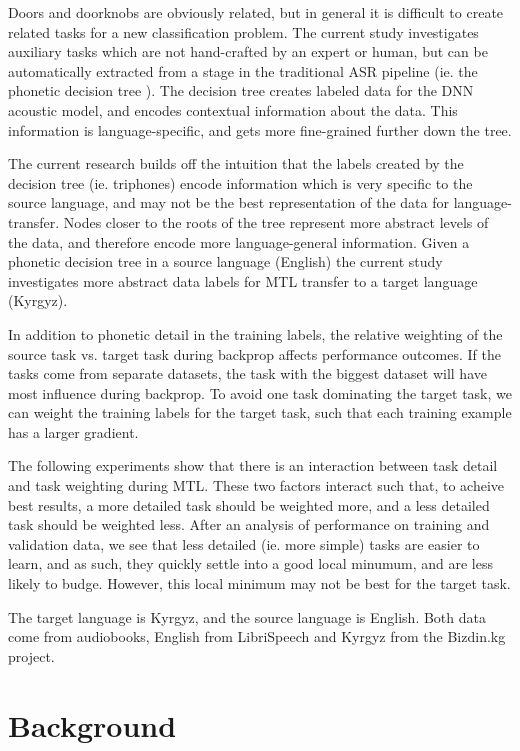 \documentclass[a4paper]{article}
\begin{document}
Doors and doorknobs are obviously related, but in general it is difficult to create related tasks for a new classification problem. The current study investigates auxiliary tasks which are not hand-crafted by an expert or human, but can be automatically extracted from a stage in the traditional ASR pipeline (ie. the phonetic decision tree \cite{young1994tree}). The decision tree creates labeled data for the DNN acoustic model, and encodes contextual information about the data. This information is language-specific, and gets more fine-grained further down the tree.

The current research builds off the intuition that the labels created by the decision tree (ie. triphones) encode information which is very specific to the source language, and may not be the best representation of the data for language-transfer. Nodes closer to the roots of the tree represent more abstract levels of the data, and therefore encode more language-general information. Given a phonetic decision tree in a source language (English) the current study investigates more abstract data labels for MTL transfer to a target language (Kyrgyz).

In addition to phonetic detail in the training labels, the relative weighting of the source task vs. target task during backprop affects performance outcomes. If the tasks come from separate datasets, the task with the biggest dataset will have most influence during backprop. To avoid one task dominating the target task, we can weight the training labels for the target task, such that each training example has a larger gradient.

The following experiments show that there is an interaction between task detail and task weighting during MTL. These two factors interact such that, to acheive best results, a more detailed task should be weighted more, and a less detailed task should be weighted less. After an analysis of performance on training and validation data, we see that less detailed (ie. more simple) tasks are easier to learn, and as such, they quickly settle into a good local minumum, and are less likely to budge. However, this local minimum may not be best for the target task.

The target language is Kyrgyz, and the source language is English. Both data come from audiobooks, English from LibriSpeech \cite{panayotov2015} and Kyrgyz from the Bizdin.kg project.




\section{Background}
\end{document}
